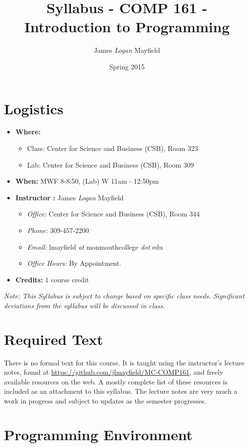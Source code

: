 \documentclass[10pt]{article}
\title{Syllabus - COMP 161 - Introduction to Programming}
\author{ James \textit{Logan} Mayfield }
\date{Spring 2015}
\begin{document}
\maketitle

\section{Logistics}
\begin{itemize}
\item \textbf{Where: } 
\begin{itemize} 
\item Class: Center for Science and Business (CSB), Room 323	
\item Lab: Center for Science and Business (CSB), Room 309
\end{itemize}
\item \textbf{When: } MWF 8-8:50, (Lab) W 11am - 12:50pm
\item \textbf{Instructor :} James \textit{Logan} Mayfield
\begin{itemize}
\item \textit{Office: } Center for Science and Business (CSB), Room 344
\item \textit{Phone: } 309-457-2200
\item \textit{Email: } lmayfield \textit{at} monmouthcollege \textit{dot} edu
\item \textit{Office Hours: }  By Appointment.
\end{itemize}
\item \textbf{Credits: } 1 course credit
\end{itemize}
\emph{Note: This Syllabus is subject to change based on specific class needs. Significant deviations from the syllabus will be discussed in class.}

\section{Required Text}

There is no formal text for this course. It is taught using the instructor's lecture notes, found at \url{https://github.com/jlmayfield/MC-COMP161}, and freely available resources on the web.  A mostly complete list of these resources is included as an attachment to this syllabus. The lecture notes are very much a work in progress and subject to updates as the semester progresses.  

\section{Programming Environment}
\end{document}
